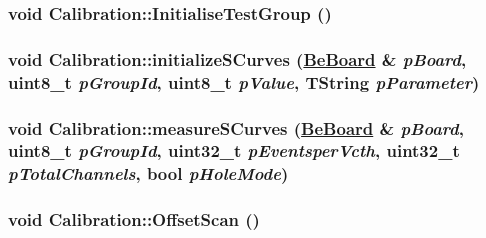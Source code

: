 \hypertarget{class_calibration_0d38b6198cd798ed2a2d3dceec93e6e1}{
\subsubsection[InitialiseTestGroup]{\setlength{\rightskip}{0pt plus 5cm}void Calibration::Initialise\-Test\-Group ()}}
\label{class_calibration_0d38b6198cd798ed2a2d3dceec93e6e1}


\hypertarget{class_calibration_4bcd5273c929942732583cf3b7b4fed8}{
\subsubsection[initializeSCurves]{\setlength{\rightskip}{0pt plus 5cm}void Calibration::initialize\-SCurves (\hyperlink{class_ph2___hw_description_1_1_be_board}{Be\-Board} \& {\em p\-Board}, uint8\_\-t {\em p\-Group\-Id}, uint8\_\-t {\em p\-Value}, TString {\em p\-Parameter})}}
\label{class_calibration_4bcd5273c929942732583cf3b7b4fed8}


\hypertarget{class_calibration_b4219c9939ddc49ca79fdaf9e13ba321}{
\subsubsection[measureSCurves]{\setlength{\rightskip}{0pt plus 5cm}void Calibration::measure\-SCurves (\hyperlink{class_ph2___hw_description_1_1_be_board}{Be\-Board} \& {\em p\-Board}, uint8\_\-t {\em p\-Group\-Id}, uint32\_\-t {\em p\-Eventsper\-Vcth}, uint32\_\-t {\em p\-Total\-Channels}, bool {\em p\-Hole\-Mode})}}
\label{class_calibration_b4219c9939ddc49ca79fdaf9e13ba321}


\hypertarget{class_calibration_90a0ab6faea40d474217ba5ab2c4d07f}{
\subsubsection[OffsetScan]{\setlength{\rightskip}{0pt plus 5cm}void Calibration::Offset\-Scan ()}}
\label{class_calibration_90a0ab6faea40d474217ba5ab2c4d07f}



